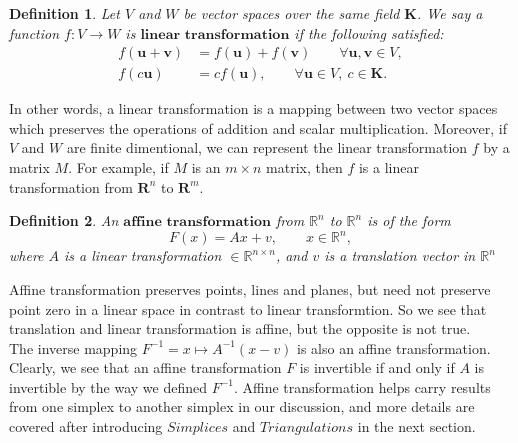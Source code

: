 \documentclass{article}
\newtheorem*{definition*}{Definition}
\begin{document}
      \begin{definition*}
      Let ${V}$ and ${W}$ be vector spaces over the same field $\textbf{K}$. We say a function $\mathit{f}: {V} \rightarrow {W}$ is $\textbf{linear transformation}$ if the following satisfied:\\
      \begin{align*}
      \mathit{f}(\textbf{u} + \textbf{v}) &= \mathit{f}(\textbf{u}) + \mathit{f}(\textbf{v}) \qquad \forall \textbf{u}, \textbf{v} \in{V},\\
      \mathit{f}(c\textbf{u}) &= c\mathit{f}(\textbf{u}), \qquad \forall \textbf{u} \in{V}, ~c\in\textbf{K}.
      \end{align*}
      \end{definition*}
      In other words, a linear transformation is a mapping between two vector spaces which preserves the operations of addition and scalar multiplication. Moreover, if ${V}$ and ${W}$ are finite dimentional, we can represent the linear transformation ${f}$ by a matrix ${M}$. For example, if ${M}$ is an ${m} \times {n}$ matrix, then ${f}$ is a linear transformation from $\mathbf{R}^n$ to $\mathbf{R}^m$. \\


      \begin{definition*}
      An $\textbf{affine transformation}$ from $\mathbb{R}^n$ to $\mathbb{R}^n$ is of the form\\
      \begin{equation*}
      {F}(x) = {Ax} + {v}, \qquad {x}\in\mathbb{R}^n,
      \end{equation*}
      where ${A}$ is a linear transformation $\in\mathbb{R}^{n\times n}$, and  ${v}$ is a translation vector in $\mathbb{R}^n$\\
      \end{definition*}
      Affine transformation preserves points, lines and planes, but need not preserve point zero in a linear space in contrast to linear transformtion. So we see that translation and linear transformation is affine, but the opposite is not true.\\
      \indent
      The inverse mapping $F^{-1} = {x} \mapsto {A}^{-1}({x} - {v})$ is also an affine transformation. Clearly, we see that an affine transformation ${F}$ is invertible if and only if ${A}$ is invertible by the way we defined ${F}^{-1}$. Affine transformation helps carry results from one simplex to another simplex in our discussion, and more details are covered after introducing ${Simplices}$ and ${Triangulations}$ in the next section.
\end{document}
